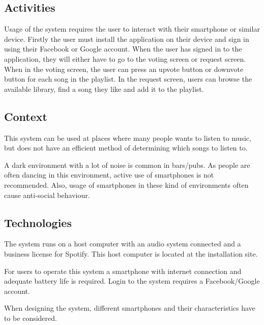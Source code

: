 \subsection{Activities}
\label{sub:pact_activities}

Usage of the system requires the user to interact with their smartphone or similar device. Firstly the user must install the application on their device and sign in using their Facebook or Google account. When the user has signed in to the application, they will either have to go to the voting screen or request screen. When in the voting screen, the user can press an upvote button or downvote button for each song in the playlist. In the request screen, users can browse the available library, find a song they like and add it to the playlist.

\subsection{Context}
\label{sub:pact_context}

This system can be used at places where many people wants to listen to music, but does not have an efficient method of determining which songs to listen to.

A dark environment with a lot of noise is common in bars/pubs. As people are often dancing in this environment, active use of smartphones is not recommended. Also, usage of smartphones in these kind of environments often cause anti-social behaviour.

\subsection{Technologies}
\label{sub:pact_technologies}

The system runs on a host computer with an audio system connected and a business license for Spotify. This host computer is located at the installation site. 

For users to operate this system a smartphone with internet connection and adequate battery life is required. Login to the system requires a Facebook/Google account.

When designing the system, different smartphones and their characteristics have to be considered.
